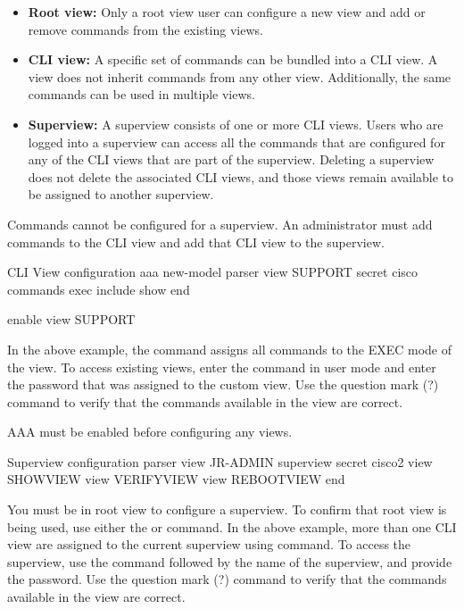\begin{itemize}
\item \textbf{Root view:} Only a root view user can configure a new view and add or remove commands from the existing views.
\item \textbf{CLI view:} A specific set of commands can be bundled into a CLI view.  A view does not inherit commands from any other view. Additionally, the same commands can be used in multiple views.
\item \textbf{Superview:} A superview consists of one or more CLI views. Users who are logged into a superview can access all the commands that are configured for any of the CLI views that are part of the superview. Deleting a superview does not delete the associated CLI views, and those views remain available to be assigned to another superview.
\end{itemize}

\note Commands cannot be configured for a superview. An administrator must add commands to the CLI view and add that CLI view to the superview.

\begin{sexylisting}{CLI View configuration}
aaa new-model
parser view SUPPORT
  secret cisco
  commands exec include show
end

enable view SUPPORT
\end{sexylisting}

In the above example, the  command assigns all  commands to the EXEC mode of the view. To access existing views, enter the  command in user mode and enter the password that was assigned to the custom view. Use the question mark (?) command to verify that the commands available in the view are correct.

\note AAA must be enabled before configuring any views.

\begin{sexylisting}{Superview configuration}
parser view JR-ADMIN superview
  secret cisco2
  view SHOWVIEW
  view VERIFYVIEW
  view REBOOTVIEW
end
\end{sexylisting}

You must be in root view to configure a superview. To confirm that root view is being used, use either the  or  command. In the above example, more than one CLI view are assigned to the current superview using  command. To access the superview, use the  command followed by the name of the superview, and provide the password. Use the question mark (?) command to verify that the commands available in the view are correct.\\

